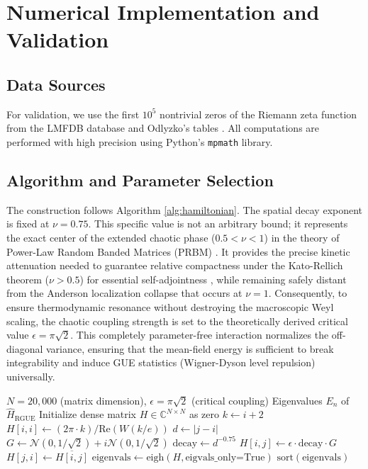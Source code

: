 \documentclass[prl,aps,floatfix,superscriptaddress,10pt]{revtex4-2}
\begin{document}
\section{Numerical Implementation and Validation}

\subsection{Data Sources}

For validation, we use the first $10^5$ nontrivial zeros of the Riemann zeta function from the LMFDB database \cite{LMFDB} and Odlyzko's tables \cite{Odlyzko2001}.
All computations are performed with high precision using Python's \texttt{mpmath} library.

\subsection{Algorithm and Parameter Selection}

The construction follows Algorithm \ref{alg:hamiltonian}. The spatial decay exponent is fixed at $\nu = 0.75$. This specific value is not an arbitrary bound; it represents the exact center of the extended chaotic phase ($0.5 < \nu < 1$) in the theory of Power-Law Random Banded Matrices (PRBM) \cite{Mirlin1996}. It provides the precise kinetic attenuation needed to guarantee relative compactness under the Kato-Rellich theorem ($\nu > 0.5$) for essential self-adjointness \cite{ReedSimon1975}, while remaining safely distant from the Anderson localization collapse that occurs at $\nu = 1$. Consequently, to ensure thermodynamic resonance without destroying the macroscopic Weyl scaling, the chaotic coupling strength is set to the theoretically derived critical value $\epsilon = \pi \sqrt{2}$. This completely parameter-free interaction normalizes the off-diagonal variance, ensuring that the mean-field energy is sufficient to break integrability and induce GUE statistics (Wigner-Dyson level repulsion) universally.

\begin{algorithm}[H]
\caption{Riemann-GUE Ensemble Generation}
\label{alg:hamiltonian}
\begin{algorithmic}[1]
\Require $N=20,000$ (matrix dimension), $\epsilon=\pi\sqrt{2}$ (critical coupling)
\Ensure Eigenvalues $E_n$ of $\hat{H}_{\text{RGUE}}$
\State Initialize dense matrix $H \in \mathbb{C}^{N \times N}$ as zero
    \State $k \gets i+2$
    \State $H[i,i] \gets (2\pi \cdot k) / \text{Re}(W(k/e))$ 
        \State $d \gets |j-i|$
         
            \State $G \gets \mathcal{N}(0, 1/\sqrt{2}) + i\mathcal{N}(0, 1/\sqrt{2})$
            \State $\text{decay} \gets d^{-0.75}$ 
            \State $H[i,j] \gets \epsilon \cdot \text{decay} \cdot G$
            \State $H[j,i] \gets \overline{H[i,j]}$ 
        \EndIf
    \EndFor
\EndFor
\State $\text{eigenvals} \gets \text{eigh}(H, \text{eigvals\_only=True})$
\State \Return $\text{sort}(\text{eigenvals})$
\end{algorithmic}
\end{algorithm}
\end{document}
